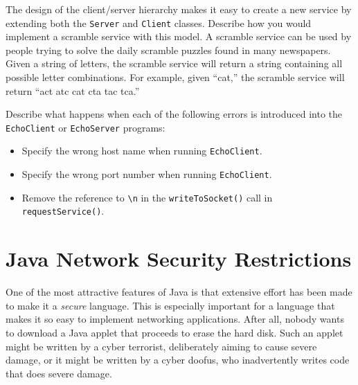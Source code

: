 {\begin{SSTUDY}

\item  The design of the client/server hierarchy makes it 
easy to create a new service by extending both the {\tt Server} and
{\tt Client} classes.  Describe how you would implement a scramble
service with this model.  A scramble service can be used by people
trying to solve the daily scramble puzzles found in many newspapers.
Given a string of letters, the scramble service will return a string
containing all possible letter combinations.  For example,
given ``cat,'' the scramble service will return ``act atc cat cta tac
tca.''

\item  Describe what happens when each of the following errors is introduced
into the {\tt EchoClient} or {\tt EchoServer} programs:

\begin{itemize}
\item  Specify the wrong host name when running {\tt EchoClient}.
\item  Specify the wrong port number when running {\tt EchoClient}.
\item  Remove the reference to \verb|\n| in the {\tt writeToSocket()}
call in {\tt request\-Service()}.
\end{itemize}
\end{SSTUDY}



\section{Java Network Security Restrictions}
\label{sec-security}\label{pg-sec-security}
\noindent One of the most attractive features of Java is that extensive effort
has been made to make it a {\it secure} language.  This is especially
important for a language that makes it so easy to implement networking
applications.   After all, nobody wants to download a Java applet that
proceeds to erase the hard disk.  Such an applet might be written
by a cyber terrorist, deliberately aiming to cause severe damage,
or it might be written by a cyber doofus, who inadvertently writes
code that does severe damage.

}
